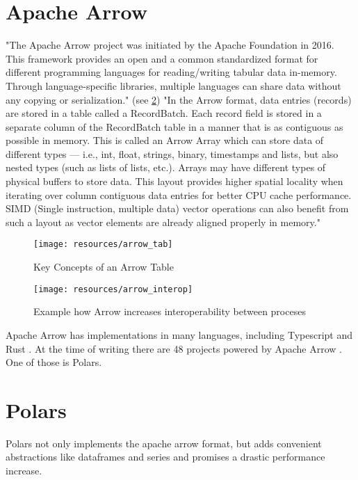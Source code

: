 \section{Apache Arrow}
\label{section:arrow}
"The Apache Arrow project was initiated by the Apache Foundation in 2016.
This framework provides an open and a common standardized format for different programming languages for reading/writing tabular data in-memory.
Through language-specific libraries, multiple languages can share data without any copying or serialization." \autocite{Ahmad2020} (see \ref{fig:arrow_com})
"In the Arrow format, data entries (records) are stored in a table called a RecordBatch.
Each record field is stored in a separate column of the RecordBatch table in a manner that is as contiguous as possible in memory.
This is called an Arrow Array which can store data of different types — i.e., int, float, strings, binary, timestamps and lists, but also nested types (such as lists of lists, etc.).
Arrays may have different types of physical buffers to store data.
This layout provides higher spatial locality when iterating over column contiguous data entries for better CPU cache performance.
SIMD (Single instruction, multiple data) vector operations can also benefit from such a layout as vector elements are already aligned properly in memory." \autocite{Ahmad2020}

\begin{figure}
	\texttt{[image: resources/arrow\_tab]}
	\caption{Key Concepts of an Arrow Table \autocite{Dremio}}
	\label{fig:arrow_tab}
\end{figure}
\begin{figure}
	\texttt{[image: resources/arrow\_interop]}
	\caption{Example how Arrow increases interoperability between proceses \autocite{Ahmad2020}}
	\label{fig:arrow_com}
\end{figure}

Apache Arrow has implementations in many languages, including Typescript and Rust \autocite{arrow:status}.
At the time of writing there are 48 projects powered by Apache Arrow \autocite{arrow:projects}.
One of those is Polars.



\section{Polars}
\label{section:polars}
Polars not only implements the apache arrow format, but adds convenient abstractions like dataframes and series and promises a drastic performance increase.

